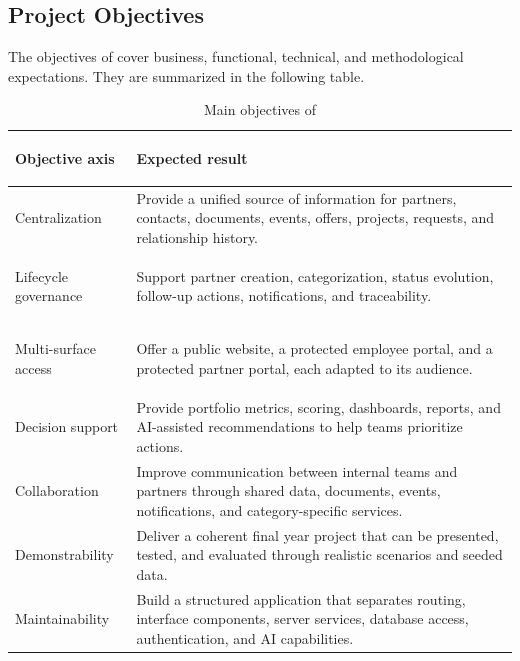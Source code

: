 \subsection{Project Objectives}
The objectives of \projectname{} cover business, functional, technical, and methodological expectations. They are summarized in the following table.
\begin{table}[H]
  \centering
  \caption{Main objectives of \projectname{}}
  \begin{tabularx}{\textwidth}{>{\bfseries\raggedright\arraybackslash}p{3.4cm}X}
    \toprule
    Objective axis & Expected result \\
    \midrule
    Centralization & Provide a unified source of information for partners, contacts, documents, events, offers, projects, requests, and relationship history. \\
    Lifecycle governance & Support partner creation, categorization, status evolution, follow-up actions, notifications, and traceability. \\
    Multi-surface access & Offer a public website, a protected employee portal, and a protected partner portal, each adapted to its audience. \\
    Decision support & Provide portfolio metrics, scoring, dashboards, reports, and AI-assisted recommendations to help teams prioritize actions. \\
    Collaboration & Improve communication between internal teams and partners through shared data, documents, events, notifications, and category-specific services. \\
    Demonstrability & Deliver a coherent final year project that can be presented, tested, and evaluated through realistic scenarios and seeded data. \\
    Maintainability & Build a structured application that separates routing, interface components, server services, database access, authentication, and AI capabilities. \\
    \bottomrule
  \end{tabularx}
\end{table}
